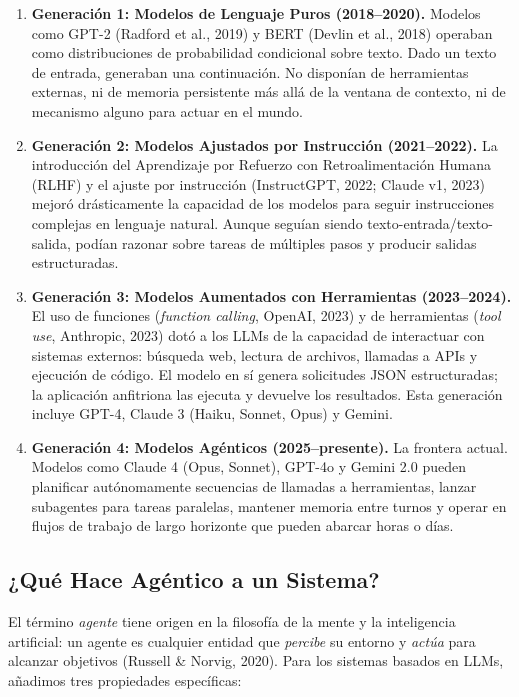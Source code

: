 \documentclass[11pt,letterpaper]{article}
\begin{document}
\begin{enumerate}[leftmargin=*]
    \item \textbf{Generación 1: Modelos de Lenguaje Puros (2018--2020).} Modelos como GPT-2 (Radford et al., 2019) y BERT (Devlin et al., 2018) operaban como distribuciones de probabilidad condicional sobre texto. Dado un texto de entrada, generaban una continuación. No disponían de herramientas externas, ni de memoria persistente más allá de la ventana de contexto, ni de mecanismo alguno para actuar en el mundo.

    \item \textbf{Generación 2: Modelos Ajustados por Instrucción (2021--2022).} La introducción del Aprendizaje por Refuerzo con Retroalimentación Humana (RLHF) y el ajuste por instrucción (InstructGPT, 2022; Claude v1, 2023) mejoró drásticamente la capacidad de los modelos para seguir instrucciones complejas en lenguaje natural. Aunque seguían siendo texto-entrada/texto-salida, podían razonar sobre tareas de múltiples pasos y producir salidas estructuradas.

    \item \textbf{Generación 3: Modelos Aumentados con Herramientas (2023--2024).} El uso de funciones (\textit{function calling}, OpenAI, 2023) y de herramientas (\textit{tool use}, Anthropic, 2023) dotó a los LLMs de la capacidad de interactuar con sistemas externos: búsqueda web, lectura de archivos, llamadas a APIs y ejecución de código. El modelo en sí genera solicitudes JSON estructuradas; la aplicación anfitriona las ejecuta y devuelve los resultados. Esta generación incluye GPT-4, Claude 3 (Haiku, Sonnet, Opus) y Gemini.

    \item \textbf{Generación 4: Modelos Agénticos (2025--presente).} La frontera actual. Modelos como Claude 4 (Opus, Sonnet), GPT-4o y Gemini 2.0 pueden planificar autónomamente secuencias de llamadas a herramientas, lanzar subagentes para tareas paralelas, mantener memoria entre turnos y operar en flujos de trabajo de largo horizonte que pueden abarcar horas o días.
\end{enumerate}

\subsection{¿Qué Hace Agéntico a un Sistema?}

El término \emph{agente} tiene origen en la filosofía de la mente y la inteligencia artificial: un agente es cualquier entidad que \emph{percibe} su entorno y \emph{actúa} para alcanzar objetivos (Russell \& Norvig, 2020). Para los sistemas basados en LLMs, añadimos tres propiedades específicas:
\end{document}
